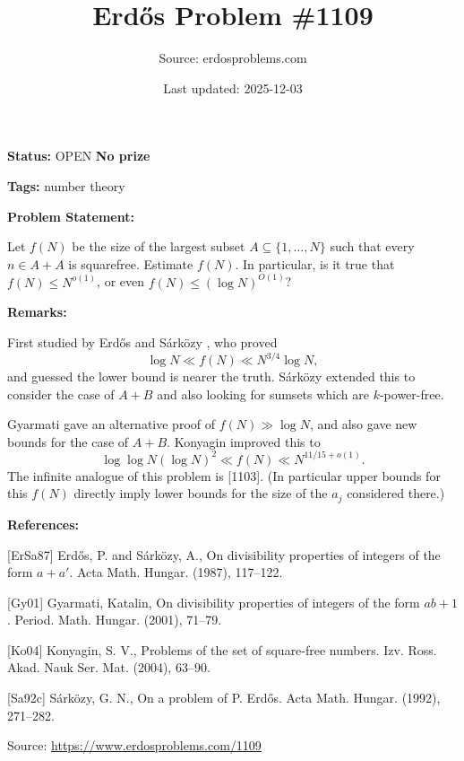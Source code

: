 \documentclass{article}
\title{Erd\H{o}s Problem \#1109}
\date{Last updated: 2025-12-03}
\author{Source: erdosproblems.com}
\begin{document}
\maketitle

\noindent\textbf{Status:} OPEN \quad \textbf{No prize}

\noindent\textbf{Tags:} number theory

\medskip
\noindent\textbf{Problem Statement:}

Let $f(N)$ be the size of the largest subset $A\subseteq \{1,\ldots,N\}$ such that every $n\in A+A$ is squarefree. Estimate $f(N)$. In particular, is it true that $f(N)\leq N^{o(1)}$, or even $f(N) \leq (\log N)^{O(1)}$?

\bigskip
\noindent\textbf{Remarks:}

First studied by Erd\H{o}s and S\'{a}rk\"{o}zy \cite{ErSa87}, who proved\[\log N \ll f(N) \ll N^{3/4}\log N,\]and guessed the lower bound is nearer the truth. S\'{a}rk\"{o}zy \cite{Sa92c} extended this to consider the case of $A+B$ and also looking for sumsets which are $k$-power-free.

Gyarmati \cite{Gy01} gave an alternative proof of $f(N)\gg \log N$, and also gave new bounds for the case of $A+B$. Konyagin \cite{Ko04} improved this to\[ \log\log N(\log N)^2\ll f(N) \ll N^{11/15+o(1)}.\]The infinite analogue of this problem is [1103]. (In particular upper bounds for this $f(N)$ directly imply lower bounds for the size of the $a_j$ considered there.)

\bigskip
\noindent\textbf{References:}

[ErSa87] Erd\H{o}s, P. and S\'{a}rk\"ozy, A., On divisibility properties of integers of the form {$a+a'$}. Acta Math. Hungar. (1987), 117--122.
 
 [Gy01] Gyarmati, Katalin, On divisibility properties of integers of the form {$ab+1$}. Period. Math. Hungar. (2001), 71--79.
 
 [Ko04] Konyagin, S. V., Problems of the set of square-free numbers. Izv. Ross. Akad. Nauk Ser. Mat. (2004), 63--90.
 
 [Sa92c] S\'{a}rk\"ozy, G. N., On a problem of {P}. {E}rd\H{o}s. Acta Math. Hungar. (1992), 271--282.

\bigskip
\noindent\small{Source: \url{https://www.erdosproblems.com/1109}}
\end{document}
